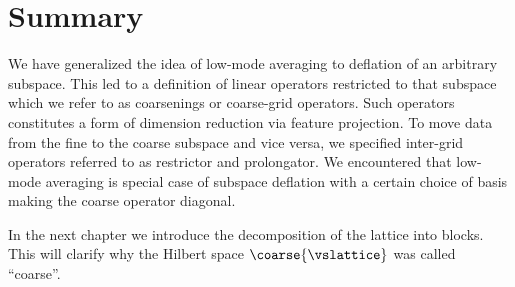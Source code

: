 \section{Summary}
\label{sec:sd:summary}

We have generalized the idea of low-mode averaging to deflation of an arbitrary subspace.
This led to a definition of linear operators restricted to that subspace which we refer to as coarsenings or coarse-grid operators.
Such operators constitutes a form of dimension reduction via feature projection.
To move data from the fine to the coarse subspace and vice versa, we specified inter-grid operators referred to as restrictor and prolongator.
We encountered that low-mode averaging is special case of subspace deflation with a certain choice of basis making the coarse operator diagonal.

In the next chapter we introduce the decomposition of the lattice into blocks.
This will clarify why the Hilbert space $\coarse{\vslattice}$ was called ``coarse''.


